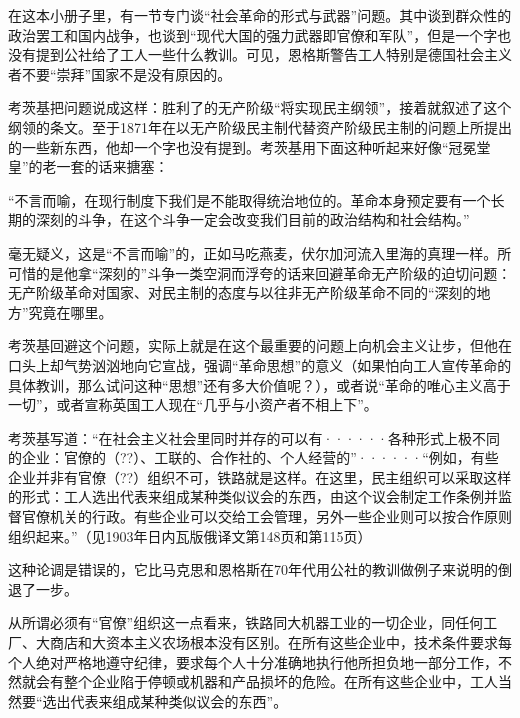 在这本小册子里，有一节专门谈“社会革命的形式与武器”问题。其中谈到群众性的政治罢工和国内战争，也谈到“现代大国的强力武器即官僚和军队”，但是一个字也没有提到公社给了工人一些什么教训。可见，恩格斯警告工人特别是德国社会主义者不要“崇拜”国家不是没有原因的。

考茨基把问题说成这样：胜利了的无产阶级“将实现民主纲领”，接着就叙述了这个纲领的条文。至于1871年在以无产阶级民主制代替资产阶级民主制的问题上所提出的一些新东西，他却一个字也没有提到。考茨基用下面这种听起来好像“冠冕堂皇”的老一套的话来搪塞：

\pskip
\leftskip=10mm
\small

“不言而喻，在现行制度下我们是不能取得统治地位的。革命本身预定要有一个长期的深刻的斗争，在这个斗争一定会改变我们目前的政治结构和社会结构。”

\normalsize
\leftskip=0mm
\pskip

毫无疑义，这是“不言而喻”的，正如马吃燕麦，伏尔加河流入里海的真理一样。所可惜的是他拿“深刻的”斗争一类空洞而浮夸的话来{\kaishu 回避}革命无产阶级的迫切问题：{\kaishu 无产阶级}革命对国家、对民主制的态度与以往非无产阶级革命不同的“深刻的地方”{\kaishu 究竟在哪里}。

考茨基回避这个问题，{\kaishu 实际上}就是在这个最重要的问题上向机会主义让步，但他在{\kaishu 口头上}却气势汹汹地向它宣战，强调“革命思想”的意义（如果怕向工人宣传革命的具体教训，那么试问这种“思想”还有多大价值呢？），或者说“革命的唯心主义高于一切”，或者宣称英国工人现在“几乎与小资产者不相上下”。

\pskip
\leftskip=10mm
\small

考茨基写道：“在社会主义社会里同时并存的可以有······各种形式上极不同的企业：官僚的（??）、工联的、合作社的、个人经营的”······“例如，有些企业并非有官僚（??）组织不可，铁路就是这样。在这里，民主组织可以采取这样的形式：工人选出代表来组成某种类似议会的东西，由这个议会制定工作条例并监督官僚机关的行政。有些企业可以交给工会管理，另外一些企业则可以按合作原则组织起来。”（见1903年日内瓦版俄译文第148页和第115页）

\normalsize
\leftskip=0mm
\pskip

这种论调是错误的，它比马克思和恩格斯在70年代用公社的教训做例子来说明的倒退了一步。

从所谓必须有“官僚”组织这一点看来，铁路同大机器工业的一切企业，同任何工厂、大商店和大资本主义农场根本没有区别。在所有这些企业中，技术条件要求每个人绝对严格地遵守纪律，要求每个人十分准确地执行他所担负地一部分工作，不然就会有整个企业陷于停顿或机器和产品损坏的危险。在所有这些企业中，工人当然要“选出代表来组成{\kaishu 某种类似议会的东西}”。

